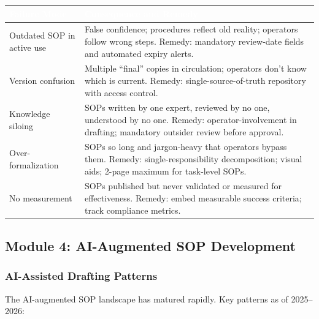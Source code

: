 \documentclass[11pt,letterpaper]{article}
\newcommand{\tableheader}[1]{\textbf{\sffamily\textcolor{white}{#1}}}
\begin{document}
\begin{center}
\begin{tabularx}{\textwidth}{L{4cm}X}
\toprule
{}
\tableheader{Failure Mode} & \tableheader{Consequence and Remedy} \\
\midrule
Outdated SOP in active use & False confidence; procedures reflect old reality; operators follow wrong steps. Remedy: mandatory review-date fields and automated expiry alerts. \\
Version confusion & Multiple ``final'' copies in circulation; operators don't know which is current. Remedy: single-source-of-truth repository with access control. \\
Knowledge siloing & SOPs written by one expert, reviewed by no one, understood by no one. Remedy: operator-involvement in drafting; mandatory outsider review before approval. \\
Over-formalization & SOPs so long and jargon-heavy that operators bypass them. Remedy: single-responsibility decomposition; visual aids; 2-page maximum for task-level SOPs. \\
No measurement & SOPs published but never validated or measured for effectiveness. Remedy: embed measurable success criteria; track compliance metrics. \\
\bottomrule
\end{tabularx}
\end{center}

\subsection{Module 4: AI-Augmented SOP Development}

\subsubsection{AI-Assisted Drafting Patterns}

The AI-augmented SOP landscape has matured rapidly. Key patterns as of 2025--2026:
\end{document}
